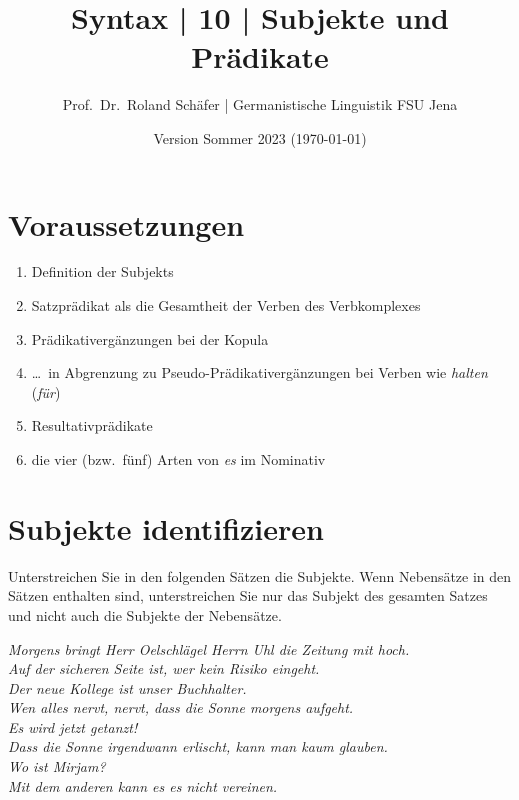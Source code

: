 \documentclass[12pt,a4paper,twoside]{article}
\author{Prof.\ Dr.\ Roland Schäfer | Germanistische Linguistik FSU Jena}
\title{Syntax | 10 | Subjekte und Prädikate}
\date{Version Sommer 2023 (\today)}
\newcommand{\Viertelzeile}{\vspace{0.25\baselineskip}}
\newcommand{\Lf}{
  \setlength{\itemsep}{1pt}
  \setlength{\parskip}{0pt}
  \setlength{\parsep}{0pt}
}
\begin{document}
\maketitle

\section*{Voraussetzungen}

\begin{enumerate}\Lf
  \item Definition der Subjekts
  \item Satzprädikat als die Gesamtheit der Verben des Verbkomplexes
  \item Prädikativergänzungen bei der Kopula
  \item \ldots\ in Abgrenzung zu Pseudo-Prädikativergänzungen bei Verben wie \textit{halten} (\textit{für})
  \item Resultativprädikate
  \item die vier (bzw.\ fünf) Arten von \textit{es} im Nominativ
\end{enumerate}

\section{Subjekte identifizieren}\label{sec:subjekte}

Unterstreichen Sie in den folgenden Sätzen die Subjekte.
Wenn Nebensätze in den Sätzen enthalten sind, unterstreichen Sie nur das Subjekt des gesamten Satzes und nicht auch die Subjekte der Nebensätze.

\begin{exe}
  \ex \textit{Morgens bringt Herr Oelschlägel Herrn Uhl die Zeitung mit hoch.} \\
  \Viertelzeile
  \ex \textit{Auf der sicheren Seite ist, wer kein Risiko eingeht.} \\
  \Viertelzeile
  \ex \textit{Der neue Kollege ist unser Buchhalter.} \\
  \Viertelzeile
  \ex \textit{Wen alles nervt, nervt, dass die Sonne morgens aufgeht.} \\
  \Viertelzeile
  \ex \textit{Es wird jetzt getanzt!} \\
  \Viertelzeile
  \ex \textit{Dass die Sonne irgendwann erlischt, kann man kaum glauben.} \\
  \Viertelzeile
  \ex \textit{Wo ist Mirjam?} \\
  \Viertelzeile
  \ex \textit{Mit dem anderen kann es es nicht vereinen.} \\
  \Viertelzeile
\end{exe}
\end{document}
